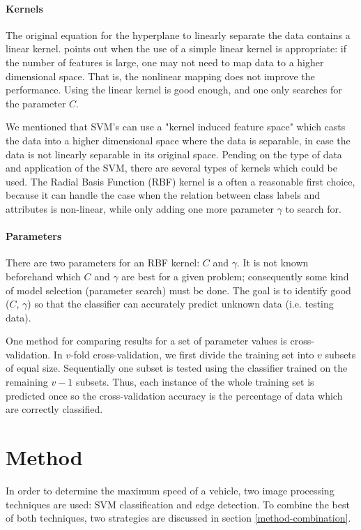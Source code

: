 \documentclass[runningheads,a4paper]{llncs}
\begin{document}
\paragraph{Kernels} The original equation for the hyperplane to linearly separate the data contains a linear kernel. \cite{Hsu2016} points out when the use of a simple linear kernel is appropriate:
if the number of features is large, one may not need to map data to a higher dimensional space. That is, the nonlinear mapping does not improve the performance. Using the linear kernel is good enough, and one only searches for the parameter $C$.

We mentioned that SVM's can use a "kernel induced feature space" which casts the data into a higher dimensional space where the data is separable, in case the data is not linearly separable in its original space. Pending on the type of data and application of the SVM, there are several types of kernels which could be used. The Radial Basis Function (RBF) kernel is a often a reasonable first choice, because it can handle the case when the relation between class labels and attributes is non-linear, while only adding one more parameter $\gamma$ to search for.

\paragraph{Parameters} There are two parameters for an RBF kernel: $C$ and $\gamma$. It is not known beforehand which $C$ and $\gamma$ are best for a given problem; consequently some kind of model selection (parameter search) must be done. The goal is to identify good ($C$, $\gamma$) so that the classifier can accurately predict unknown data (i.e. testing data).

One method for comparing results for a set of parameter values is cross-validation. In $v$-fold cross-validation, we first divide the training set into $v$ subsets of equal size. Sequentially one subset is tested using the classifier trained on the remaining $v − 1$ subsets. Thus, each instance of the whole training set is predicted once so the cross-validation accuracy is the percentage of data which are correctly classified.

\section{Method}
In order to determine the maximum speed of a vehicle, two image processing techniques are used: SVM classification and edge detection. To combine the best of both techniques, two strategies are discussed in section \ref{method-combination}.
\end{document}
